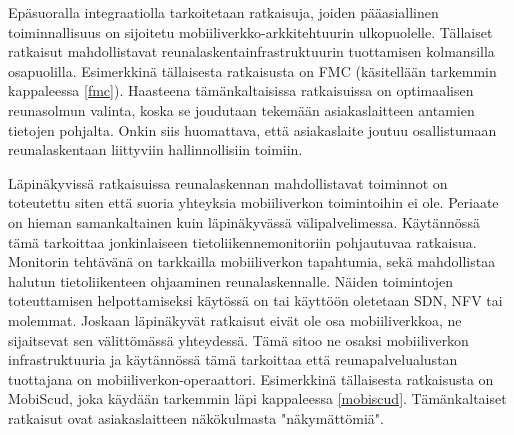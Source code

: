 Epäsuoralla integraatiolla tarkoitetaan ratkaisuja, joiden pääasiallinen toiminnallisuus on sijoitetu mobiiliverkko-arkkitehtuurin ulkopuolelle. 
Tällaiset ratkaisut mahdollistavat reunalaskentainfrastruktuurin tuottamisen kolmansilla osapuolilla. Esimerkkinä tällaisesta ratkaisusta on FMC (käsitellään tarkemmin kappaleessa \ref{fmc}). Haasteena tämänkaltaisissa ratkaisuissa on optimaalisen reunasolmun valinta, koska se joudutaan tekemään asiakaslaitteen antamien tietojen pohjalta. Onkin siis huomattava, että asiakaslaite joutuu osallistumaan reunalaskentaan liittyviin hallinnollisiin toimiin.

Läpinäkyvissä ratkaisuissa reunalaskennan mahdollistavat toiminnot on toteutettu siten että suoria yhteyksia mobiiliverkon toimintoihin ei ole. 
Periaate on hieman samankaltainen kuin läpinäkyvässä välipalvelimessa.
Käytännössä tämä tarkoittaa jonkinlaiseen tietoliikennemonitoriin pohjautuvaa ratkaisua. 
Monitorin tehtävänä on tarkkailla mobiiliverkon tapahtumia, sekä mahdollistaa halutun tietoliikenteen ohjaaminen reunalaskennalle.
Näiden toimintojen toteuttamisen helpottamiseksi käytössä on tai käyttöön oletetaan SDN, NFV tai molemmat.
Joskaan läpinäkyvät ratkaisut eivät ole osa mobiiliverkkoa, ne sijaitsevat sen välittömässä yhteydessä. Tämä sitoo ne osaksi mobiiliverkon infrastruktuuria ja käytännössä tämä tarkoittaa että reunapalvelualustan tuottajana on mobiiliverkon-operaattori. 
Esimerkkinä tällaisesta ratkaisusta on MobiScud, joka käydään tarkemmin läpi kappaleessa \ref{mobiscud}. Tämänkaltaiset ratkaisut ovat asiakaslaitteen näkökulmasta "näkymättömiä".
